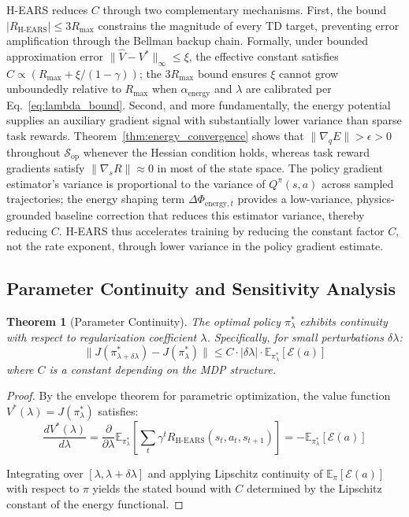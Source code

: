 \documentclass[journal]{IEEEtran}
\newtheorem{theorem}{Theorem}[section]
\begin{document}
	H-EARS reduces $C$ through two complementary mechanisms. First, the bound $|R_{\text{H-EARS}}| \leq 3R_{\max}$ constrains the magnitude of every TD target, preventing error amplification through the Bellman backup chain. Formally, under bounded approximation error $\|\hat{V} - V^*\|_\infty \leq \xi$, the effective constant satisfies $C \propto (R_{\max} + \xi/(1-\gamma))$; the $3R_{\max}$ bound ensures $\xi$ cannot grow unboundedly relative to $R_{\max}$ when $\alpha_{\text{energy}}$ and $\lambda$ are calibrated per Eq.~\eqref{eq:lambda_bound}. Second, and more fundamentally, the energy potential supplies an auxiliary gradient signal with substantially lower variance than sparse task rewards. Theorem~\ref{thm:energy_convergence} shows that $\|\nabla_q E\| > \epsilon > 0$ throughout $\mathcal{S}_{\text{op}}$ whenever the Hessian condition holds, whereas task reward gradients satisfy $\|\nabla_s R\| \approx 0$ in most of the state space. The policy gradient estimator's variance is proportional to the variance of $Q^\pi(s,a)$ across sampled trajectories; the energy shaping term $\Delta\Phi_{\text{energy},t}$ provides a low-variance, physics-grounded baseline correction that reduces this estimator variance, thereby reducing $C$. H-EARS thus accelerates training by reducing the constant factor $C$, not the rate exponent, through lower variance in the policy gradient estimate.
	
	\subsection{Parameter Continuity and Sensitivity Analysis}
	
	\begin{theorem}[Parameter Continuity]
		\label{thm:parameter_continuity}
		The optimal policy $\pi^*_\lambda$ exhibits continuity with respect to regularization coefficient $\lambda$. Specifically, for small perturbations $\delta\lambda$:
		\begin{equation}
			\|J(\pi^*_{\lambda+\delta\lambda}) - J(\pi^*_\lambda)\| \leq C\cdot|\delta\lambda|\cdot\mathbb{E}_{\pi^*_\lambda}[\mathcal{E}(a)]
		\end{equation}
		where $C$ is a constant depending on the MDP structure.
	\end{theorem}
	
	\begin{proof}
		By the envelope theorem for parametric optimization, the value function $V^*(\lambda) = J(\pi^*_\lambda)$ satisfies:
		\begin{equation}
			\frac{dV^*(\lambda)}{d\lambda} = \frac{\partial}{\partial\lambda}\mathbb{E}_{\pi^*_\lambda}\left[\sum_t \gamma^t R_{\text{H-EARS}}(s_t,a_t,s_{t+1})\right] = -\mathbb{E}_{\pi^*_\lambda}[\mathcal{E}(a)]
		\end{equation}
		
		Integrating over $[\lambda, \lambda+\delta\lambda]$ and applying Lipschitz continuity of $\mathbb{E}_\pi[\mathcal{E}(a)]$ with respect to $\pi$ yields the stated bound with $C$ determined by the Lipschitz constant of the energy functional.
	\end{proof}
	
\end{document}
